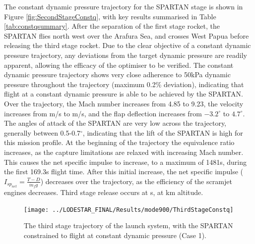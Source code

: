 The constant dynamic pressure trajectory for the SPARTAN stage is shown in Figure \ref{fig:SecondStageConstq}, with key results summarised in Table \ref{tab:constqsummary}. After the separation of the first stage rocket, the SPARTAN flies north west over the Arafura Sea, and crosses West Papua before releasing the third stage rocket. Due to the clear objective of a constant dynamic pressure trajectory, any deviations from the target dynamic pressure are readily apparent, allowing the efficacy of the optimiser to be verified. 
The constant dynamic pressure trajectory shows very close adherence to 50kPa dynamic pressure  throughout the trajectory (maximum 0.2\% deviation), indicating that flight at a constant dynamic pressure is able to be achieved by the SPARTAN.  
Over the trajectory, the Mach number increases from 4.85 to 9.23, the velocity increases from \firstsecondSeparationvConstqNoReturn m/s to \secondthirdSeparationvConstqNoReturn m/s, and the flap deflection increases from $-3.2^\circ$ to $4.7^\circ$. The angles of attack of the SPARTAN are very low across the trajectory, generally between 0.5-0.7$^\circ$, indicating that the lift of the SPARTAN is high for this mission profile. At the beginning of the trajectory the equivalence ratio increases, as the capture limitations are relaxed with increasing Mach number. This causes the net specific impulse to increase, to a maximum of 1481s, during the first 169.3s flight time.  After this initial increase, the net specific impulse ($I_{sp_{net}} = \frac{T-D}{\dot{m}_f g}$) decreases over the trajectory, as the efficiency of the scramjet engines decreases. 
Third stage release occurs at \secondFlightTimeConstqNoReturn s, at \secondthirdSeparationAltConstqNoReturn km altitude.

\begin{figure}[ht!]
\centering
\texttt{[image: ../LODESTAR\_FINAL/Results/mode900/ThirdStageConstq]}
\caption{The third stage trajectory of the launch system, with the SPARTAN constrained to flight at constant dynamic pressure (Case 1).}
\label{fig:ThirdStageConstq}
\end{figure}

